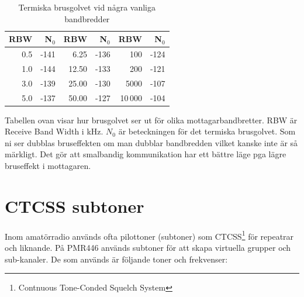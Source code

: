 \begin{table}[H]
\centering
\begin{tabular}{rr|rr|rr}
	\textbf{RBW} & \textbf{N$_0$} & \textbf{RBW} & \textbf{N$_0$} & \textbf{RBW} & \textbf{N$_0$} \\ \hline
	         0.5 &           -141 &         6.25 &           -136 &          100 &           -124 \\
	         1.0 &           -144 &        12.50 &           -133 &          200 &           -121 \\
	         3.0 &           -139 &        25.00 &           -130 &         5000 &           -107 \\
	         5.0 &           -137 &        50.00 &           -127 &        10\,000 &           -104
\end{tabular}
\caption{Termiska brusgolvet vid några vanliga bandbredder}
\end{table}

Tabellen ovan visar hur brusgolvet ser ut för olika mottagarbandbretter. RBW är
Receive Band Width i kHz. $N_0$ är beteckningen för det termiska brusgolvet. Som
ni ser dubblas bruseffekten om man dubblar bandbredden vilket kanske inte är så
märkligt. Det gör att smalbandig kommunikation har ett bättre läge pga lägre
bruseffekt i mottagaren.


\section{CTCSS subtoner}

Inom amatörradio används ofta pilottoner (subtoner) som
CTCSS\footnote{Contnuous Tone-Conded Squelch System} för repeatrar och
liknande. På PMR446 används subtoner för att skapa virtuella grupper och
sub-kanaler. De som används är följande toner och frekvenser:

